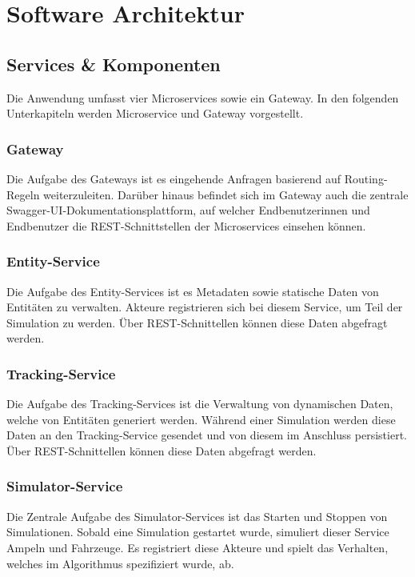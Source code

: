 \section{Software Architektur}

\subsection{Services \& Komponenten}

Die Anwendung umfasst vier Microservices sowie ein Gateway.
In den folgenden Unterkapiteln werden Microservice und Gateway vorgestellt.

\subsubsection{Gateway}

Die Aufgabe des Gateways ist es eingehende Anfragen basierend auf Routing-Regeln weiterzuleiten.
Darüber hinaus befindet sich im Gateway auch die zentrale Swagger-UI-Dokumentationsplattform, auf welcher Endbenutzerinnen und Endbenutzer die REST-Schnittstellen der Microservices einsehen können.

\subsubsection{Entity-Service}

Die Aufgabe des Entity-Services ist es Metadaten sowie statische Daten von Entitäten zu verwalten.
Akteure registrieren sich bei diesem Service, um Teil der Simulation zu werden.
Über REST-Schnittellen können diese Daten abgefragt werden.

\subsubsection{Tracking-Service}

Die Aufgabe des Tracking-Services ist die Verwaltung von dynamischen Daten, welche von Entitäten generiert werden.
Während einer Simulation werden diese Daten an den Tracking-Service gesendet und von diesem im Anschluss persistiert.
Über REST-Schnittellen können diese Daten abgefragt werden.

\subsubsection{Simulator-Service}

Die Zentrale Aufgabe des Simulator-Services ist das Starten und Stoppen von Simulationen.
Sobald eine Simulation gestartet wurde, simuliert dieser Service Ampeln und Fahrzeuge.
Es registriert diese Akteure und spielt das Verhalten, welches im Algorithmus spezifiziert wurde, ab.

